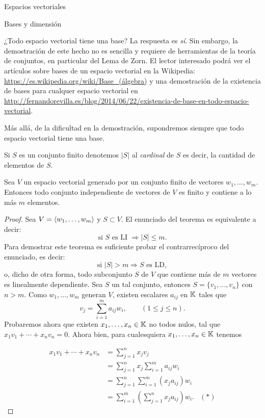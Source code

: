 \begin{chapter}{Espacios vectoriales}
\begin{section}{Bases y dimensi\'on}
\begin{observacion*}
    ¿Todo espacio vectorial tiene una base? La respuesta es \textit{sí}. Sin embargo, la demostración de este hecho no es sencilla y requiere de herramientas de la teoría de conjuntos,  en particular del Lema de Zorn. El lector interesado podrá ver el artículos sobre bases de un espacio vectorial en la Wikipedia:  
    \href{https://es.wikipedia.org/wiki/Base\_(álgebra)}{https://es.wikipedia.org/wiki/Base\_(álgebra)} y una demostración de la existencia de bases para cualquer espacio vectorial en  
    \href{http://fernandorevilla.es/blog/2014/06/22/existencia-de-base-en-todo-espacio-vectorial/}{http://fernandorevilla.es/blog/2014/06/22/existencia-de-base-en-todo-espacio-vectorial}.

    Más allá, de la dificultad en la demostración, supondremos siempre que todo espacio vectorial tiene una base. 
\end{observacion*}

Si $S$ es un conjunto finito denotemos $|S|$  al \textit{cardinal} de  $S$ es decir, la cantidad de elementos de $S$. 

\begin{teorema}\label{indep-menorigual-gen}
    Sea $V$ un espacio vectorial generado por un conjunto finito de vectores $w_1,\ldots,w_m$. Entonces todo conjunto independiente de vectores de $V$ es finito y  contiene a lo más $m$ elementos. 
\end{teorema}
\begin{proof} Sea $V = \langle w_1,\ldots,w_m\rangle$ y  $S \subset V$.   El  enunciado del teorema es equivalente a decir:
    $$
    \text{si }S \text{ es LI } \Rightarrow |S| \le m.
    $$
    Para demostrar este teorema es suficiente probar el contrarrecíproco del enunciado, es decir:
    $$
    \text{si }|S| > m \Rightarrow S \text{ es LD},
    $$
    o, dicho  de otra forma, todo subconjunto $S$ de $V$ que contiene más de $m$ vectores es linealmente dependiente. Sea $S$ un tal conjunto,  entonces $S = \{v_1,\ldots,v_n\}$ con $n >m$.  Como  $w_1,\ldots,w_m$ generan $V$, existen escalares $a_{ij}$ en $\mathbb K$ tales que
    \begin{equation*}
        v_j = \sum_{i=1}^{m}a_{ij}w_i, \qquad (1 \le j \le n).
    \end{equation*}
    Probaremos ahora que existen $x_1,\ldots,x_n \in \mathbb K$ no todos nulos, tal que $x_1v_1 + \cdots+x_nv_n =0$. Ahora bien, para cualesquiera $x_1,\ldots,x_n \in \mathbb K$ tenemos


    \begin{align*}
        x_1v_1 + \cdots+x_nv_n &= \sum_{j=1}^{n} x_jv_j& \\
        & = \sum_{j=1}^{n}x_j \sum_{i=1}^{m}a_{ij}w_i& \\
        & = \sum_{j=1}^{n} \sum_{i=1}^{m}(x_ja_{ij})w_i& \\ 
        & = \sum_{i=1}^{m}(\sum_{j=1}^{n} x_ja_{ij})w_i.&  (*)
    \end{align*}
    

\end{proof}
\end{section}
\end{chapter}
